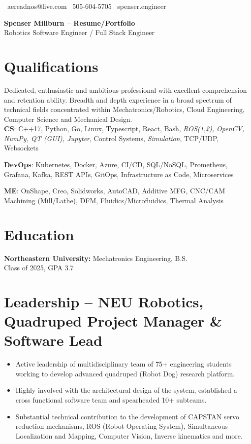 \documentclass[11pt,a4paper]{article}
\newcommand{\header}[2]{
  \begin{center}
    \huge \textbf{#1}\\
    \large #2
  \end{center}
}
\newcommand{\qualificationarea}[2]{
  \textbf{#1}: #2
}
\begin{document}
\begin{center}
  \small \faEnvelope\ aereadnos@live.com \hspace{1em} \faPhone\ 505-604-5705 \hspace{1em} \faGlobe\ spenser.engineer
\end{center}
\header{Spenser Millburn -- Resume/Portfolio}{Robotics Software Engineer / Full Stack Engineer}

\section*{Qualifications}
Dedicated, enthusiastic and ambitious professional with excellent comprehension and retention ability. Breadth and depth experience in a broad spectrum of technical fields concentrated within Mechatronics/Robotics, Cloud Engineering, Computer Science and Mechanical Design.\\

\qualificationarea{CS}{C++17, Python, Go, Linux, Typescript, React, Bash, \textit{ROS(1,2), OpenCV, NumPy, QT (GUI), Jupyter}, Control Systems, \textit{Simulation}, TCP/UDP, Websockets}

\qualificationarea{DevOps}{Kubernetes, Docker, Azure, CI/CD, SQL/NoSQL, Prometheus, Grafana, Kafka, REST APIs, GitOps, Infrastructure as Code, Microservices}

\qualificationarea{ME}{OnShape, Creo, Solidworks, AutoCAD, Additive MFG, CNC/CAM Machining (Mill/Lathe), DFM, Fluidics/Microfluidics, Thermal Analysis}

\section*{Education}
\textbf{Northeastern University:} Mechatronics Engineering, B.S.\\
Class of 2025, GPA 3.7


\section*{Leadership -- NEU Robotics, Quadruped Project Manager \& Software Lead}
\begin{itemize}
\item Active leadership of multidisciplinary team of 75+ engineering students working to develop advanced quadruped (Robot Dog) research platform.
\item Highly involved with the architectural design of the system, established a cross functional software team and spearheaded 10+ subteams.
\item Substantial technical contribution to the development of CAPSTAN servo reduction mechanisms, ROS (Robot Operating System), Simultaneous Localization and Mapping, Computer Vision, Inverse kinematics and more.
\end{itemize}
\end{document}
